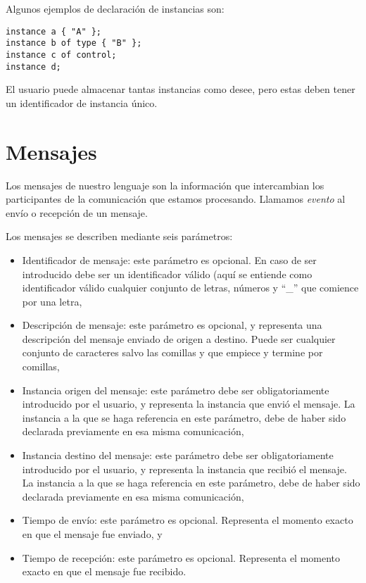 Algunos ejemplos de declaración de instancias son:

\begin{lstlisting}
instance a { "A" };
instance b of type { "B" };
instance c of control;
instance d;
\end{lstlisting}

El usuario puede almacenar tantas instancias como desee, pero estas
deben tener un identificador de instancia único.

\section{Mensajes}\label{sec:Mensajes}

Los mensajes de nuestro lenguaje son la información que intercambian
los participantes de la comunicación que estamos procesando. Llamamos
\textit{evento} al envío o recepción de un mensaje.

Los mensajes se describen mediante seis parámetros:

\begin{itemize}
\item Identificador de mensaje: este parámetro es opcional. En caso de
  ser introducido debe ser un identificador válido (aquí se entiende
  como identificador válido cualquier conjunto de letras, números y
  ``\_'' que comience por una letra,
\item Descripción de mensaje: este parámetro es opcional, y representa
  una descripción del mensaje enviado de origen a destino. Puede ser
  cualquier conjunto de caracteres salvo las comillas y que empiece y
  termine por comillas, 
\item Instancia origen del mensaje: este parámetro debe ser
  obligatoriamente introducido por el usuario, y representa la
  instancia que envió el mensaje. La instancia a la que se haga
  referencia en este parámetro, debe de haber sido declarada
  previamente en esa misma comunicación,
\item Instancia destino del mensaje: este parámetro debe ser
  obligatoriamente introducido por el usuario, y representa la
  instancia que recibió el mensaje. La instancia a la que se haga
  referencia en este parámetro, debe de haber sido declarada
  previamente en esa misma comunicación,
\item Tiempo de envío: este parámetro es opcional. Representa el
  momento exacto en que el mensaje fue enviado, y
\item Tiempo de recepción: este parámetro es opcional. Representa el
  momento exacto en que el mensaje fue recibido.
\end{itemize}

